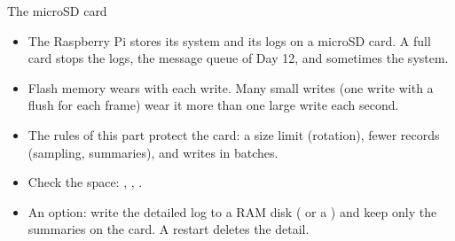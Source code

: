 \begin{frame}{The microSD card}
  \small
  \begin{itemize}
    \item The Raspberry Pi stores its system and its logs on a microSD card.
          A full card stops the logs, the message queue of Day 12, and
          sometimes the system.
    \item Flash memory wears with each write. Many small writes (one write
          with a flush for each frame) wear it more than one large write
          each second.
    \item The rules of this part protect the card: a size limit
          (rotation), fewer records (sampling, summaries), and writes in
          batches.
    \item Check the space: , ,
          .
    \item An option: write the detailed log to a RAM disk ( or a
          ) and keep only the summaries on the card. A restart
          deletes the detail.
  \end{itemize}
\end{frame}

